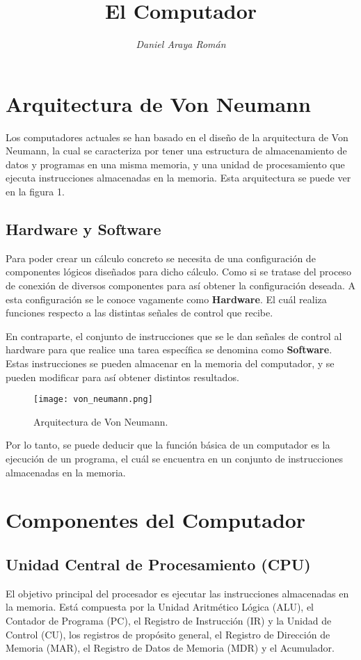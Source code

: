 \documentclass{article}
\title{\LARGE\textbf{El Computador}}
\author{\large\textit{Daniel Araya Román}}
\date{}
\begin{document}
\maketitle

\section*{Arquitectura de Von Neumann}
Los computadores actuales se han basado en el dise\~{n}o de la
arquitectura de Von Neumann, la cual se caracteriza por tener una
estructura de almacenamiento de datos y programas en una misma memoria,
y una unidad de procesamiento que ejecuta instrucciones almacenadas en
la memoria. Esta arquitectura se puede ver en la figura 1.

\subsection*{Hardware y Software}
Para poder crear un c\'{a}lculo concreto se necesita de una configuraci\'{o}n
de componentes l\'{o}gicos dise\~{n}ados para dicho c\'{a}lculo. Como si se
tratase del proceso de conexi\'{o}n de diversos componentes para as\'{i}
obtener la configuraci\'{o}n deseada. A esta configuraci\'{o}n se le conoce
vagamente como \textbf{Hardware}. El cu\'{a}l realiza funciones respecto a las
distintas se\~{n}ales de control que recibe.

En contraparte, el conjunto de instrucciones que se le dan se\~{n}ales de control
al hardware para que realice una tarea espec\'{i}fica se denomina como
\textbf{Software}. Estas instrucciones se pueden almacenar en la memoria del
computador, y se pueden modificar para as\'{i} obtener distintos resultados.

\begin{figure}[h]
    \centering
    \texttt{[image: von\_neumann.png]}
    \caption{Arquitectura de Von Neumann.}
\end{figure}

Por lo tanto, se puede deducir que la funci\'{o}n b\'{a}sica de un computador es
la ejecuci\'{o}n de un programa, el cu\'{a}l se encuentra en un conjunto de
instrucciones almacenadas en la memoria.
\newpage

\section*{Componentes del Computador}

\subsection*{Unidad Central de Procesamiento (CPU)}
El objetivo principal del procesador es ejecutar las instrucciones almacenadas en
la memoria. Est\'{a} compuesta por la Unidad Aritm\'{e}tico L\'{o}gica (ALU),
el Contador de Programa (PC), el Registro de Instrucci\'{o}n (IR) y la Unidad de
Control (CU), los registros de prop\'{o}sito general, el Registro de Direcci\'{o}n
de Memoria (MAR), el Registro de Datos de Memoria (MDR) y el Acumulador.
\end{document}
